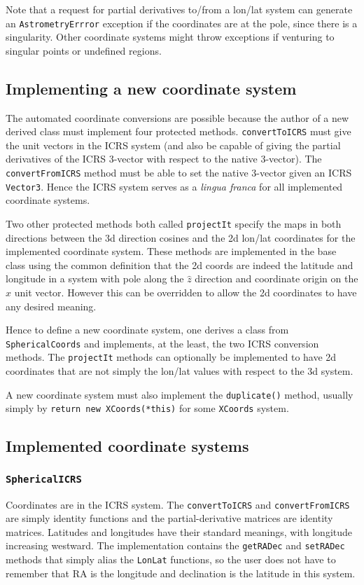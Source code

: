 \documentclass[11pt,preprint,flushrt]{aastex}
\begin{document}
Note that a request for partial derivatives to/from a lon/lat system can generate an {\tt AstrometryErrror} exception if the coordinates are at the pole, since there is a singularity.  Other coordinate systems might throw exceptions if venturing to singular points or undefined regions.

\subsection{Implementing a new coordinate system}
The automated coordinate conversions are possible because the author of a new derived class must implement four protected methods.  {\tt convertToICRS} must give the unit vectors in the ICRS system (and also be capable of giving the partial derivatives of the ICRS 3-vector with respect to the native 3-vector).   The {\tt convertFromICRS} method must be able to set the native 3-vector given an ICRS {\tt Vector3}.  Hence the ICRS system serves as a {\it lingua franca} for all implemented coordinate systems.

Two other protected methods both called {\tt projectIt} specify the maps in both directions between the 3d direction cosines and the 2d lon/lat coordinates for the implemented coordinate system.  These methods are implemented in the base class using the common definition that the 2d coords are indeed the latitude and longitude in a system with pole along the $\hat z$ direction and coordinate origin on the $\hat x$ unit vector.  However this can be overridden to allow the 2d coordinates to have any desired meaning.

Hence to define a new coordinate system, one derives a class from {\tt SphericalCoords} and implements, at the least, the two ICRS conversion methods.  The {\tt projectIt} methods can optionally be implemented to have 2d coordinates that are not simply the lon/lat values with respect to the 3d system.

A new coordinate system must also implement the {\tt duplicate()} method, usually simply by {\tt return new XCoords(*this)} for some {\tt XCoords} system.

\subsection{Implemented coordinate systems}
\subsubsection{{\tt SphericalICRS}}
Coordinates are in the ICRS system.  The {\tt convertToICRS} and {\tt convertFromICRS} are simply identity functions and the partial-derivative matrices are identity matrices.  Latitudes and longitudes have their standard meanings, with longitude increasing westward.  The implementation contains the {\tt getRADec} and {\tt setRADec} methods that simply alias the {\tt LonLat} functions, so the user does not have to remember that RA is the longitude and declination is the latitude in this system.
\end{document}
